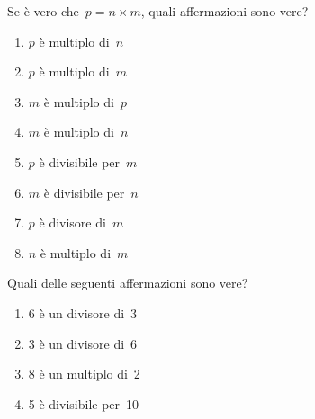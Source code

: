 \begin{esercizio}
 Se è vero che~\(p=n\times m\), quali affermazioni sono vere?
\begin{multicols}{2}
\TabPositions{3.2cm}
\begin{enumerate}[noitemsep, label=(\alph*)]
 \item \(p\) è multiplo di~\(n\)	\tab\boxV\quad\boxF
 \item \(p\) è multiplo di~\(m\)	\tab\boxV\quad\boxF
 \item \(m\) è multiplo di~\(p\)	\tab\boxV\quad\boxF
 \item \(m\) è multiplo di~\(n\)	\tab\boxV\quad\boxF
 \item \(p\) è divisibile per~\(m\)	\tab\boxV\quad\boxF
 \item \(m\) è divisibile per~\(n\)	\tab\boxV\quad\boxF
 \item \(p\) è divisore di~\(m\)	\tab\boxV\quad\boxF
 \item \(n\) è multiplo di~\(m\)	\tab\boxV\quad\boxF
\end{enumerate}
\end{multicols}
\end{esercizio}

\begin{esercizio}
 Quali delle seguenti affermazioni sono vere?

\begin{multicols}{2}
\TabPositions{3.2cm}
 \begin{enumerate}[noitemsep, label=(\alph*)]
 \item 6 è un divisore di~3 \tab\boxV\quad\boxF
 \item 3 è un divisore di~6 \tab\boxV\quad\boxF
 \item 8 è un multiplo di~2 \tab\boxV\quad\boxF
 \item 5 è divisibile per~10 \tab\boxV\quad\boxF
 \end{enumerate}
\end{multicols}
\end{esercizio}


